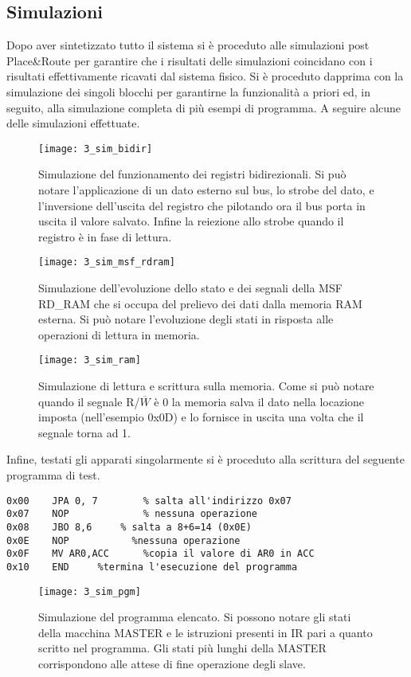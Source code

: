 \subsection{Simulazioni}
Dopo aver sintetizzato tutto il sistema si è proceduto alle simulazioni post Place\&Route per garantire che i risultati delle simulazioni coincidano con i risultati effettivamente ricavati dal sistema fisico. Si è proceduto dapprima con la simulazione dei singoli blocchi per garantirne la funzionalità a priori ed, in seguito, alla simulazione completa di più esempi di programma. A seguire alcune delle simulazioni effettuate.
\begin{figure}[H]
	\centering
	\texttt{[image: 3\_sim\_bidir]}
	\caption{Simulazione del funzionamento dei registri bidirezionali. Si può notare l'applicazione di un dato esterno sul bus, lo strobe del dato, e l'inversione dell'uscita del registro che pilotando ora il bus porta in uscita il valore salvato. Infine la reiezione allo strobe quando il registro è in fase di lettura.}
	\label{fig:sim_bidir}
\end{figure}
\begin{figure}[H]
	\centering
	\texttt{[image: 3\_sim\_msf\_rdram]}
	\caption{Simulazione dell'evoluzione dello stato e dei segnali della MSF RD\_RAM che si occupa del prelievo dei dati dalla memoria RAM esterna. Si può notare l'evoluzione degli stati in risposta alle operazioni di lettura in memoria.}
	\label{fig:sim_msf_rdram}
\end{figure}
\begin{figure}[H]
	\centering
	\texttt{[image: 3\_sim\_ram]}
	\caption{Simulazione di lettura e scrittura sulla memoria. Come si può notare quando il segnale R/$\overline{W}$ è 0 la memoria salva il dato nella locazione imposta (nell'esempio 0x0D) e lo fornisce in uscita una volta che il segnale torna ad 1.}
	\label{fig:sim_ram}
\end{figure}
\noindent
Infine, testati gli apparati singolarmente si è proceduto alla scrittura del seguente programma di test.
\begin{lstlisting}[frame=single] 
0x00	JPA 0, 7		% salta all'indirizzo 0x07
0x07	NOP				% nessuna operazione
0x08	JBO 8,6		% salta a 8+6=14 (0x0E)
0x0E	NOP		      %nessuna operazione
0x0F	MV AR0,ACC		%copia il valore di AR0 in ACC
0x10	END		%termina l'esecuzione del programma
\end{lstlisting}
\begin{figure}[H]
	\centering
	\texttt{[image: 3\_sim\_pgm]}
	\caption{Simulazione del programma elencato. Si possono notare gli stati della macchina MASTER e le istruzioni presenti in IR pari a quanto scritto nel programma. Gli stati più lunghi della MASTER corrispondono alle attese di fine operazione degli slave.}
	\label{fig:sim_pgm}
\end{figure}
